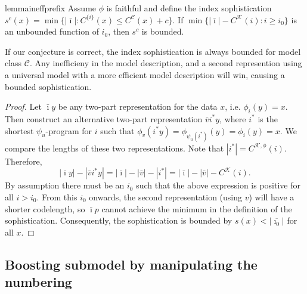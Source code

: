 \documentclass{style/llncs}
\newcommand{\C}{\mathscr C}
\newcommand{\K}{\mathscr K}
\begin{document}
\begin{restatable}{lemma}{ineffprefix}
Assume $\phi$ is faithful and define the index sophistication $s^c(x)=\min\{|\bar\imath|:C^{\{i\}}(x)\le C^{\C}(x)+c\}$.
If $\min\{|\bar\imath|-C^\K(i):i\ge i_0\}$ is an unbounded function of $i_0$, then $s^c$ is bounded.\label{lemma:prefix-inefficiency}
\end{restatable}
If our conjecture is correct, the index sophistication is always bounded for model class $\C$. Any inefficieny in the model description, and a second represention using a universal model with a more efficient model description will win, causing a bounded sophistication.

\begin{proof}
Let $\bar\imath y$ be any two-part representation for the data $x$, i.e. $\phi_i(y)=x$. Then construct an alternative two-part representation $\bar vi^* y$, where $i^*$ is the shortest $\psi_u$-program for $i$ such that $\phi_v(i^* y)=\phi_{\psi_u(i^*)}(y) = \phi_i(y)=x$. We compare the lengths of these two representations. Note that $|i^*|=C^{\K,\phi}(i)$. Therefore,
\[
|\bar\imath y|-|\bar v i^* y| = |\bar\imath|-|\bar v| - |i^*| = |\bar\imath|-|\bar v|-C^{\K}(i).
\]
By assumption there must be an $i_0$ such that the above expression is positive for all $i>i_0$. From this $i_0$ onwards, the second representation (using $v$) will have a shorter codelength, so $\bar\imath p$ cannot achieve the minimum in the definition of the sophistication. Consequently, the sophistication is bounded by $s(x)<|\overline{\imath_0}|$ for all $x$. 
\end{proof}

\subsection{Boosting submodel by manipulating the numbering}

\coolone*
\end{document}
